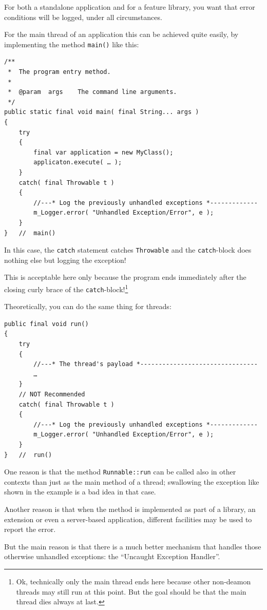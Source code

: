 \documentclass[11pt,a4paper, titlepage, parskip=half, headsepline, footsepline, cleardoublepage=current, headheight=1cm]{scrbook}
\begin{document}
For both a standalone application and for a feature library, you want that error conditions will be logged, under all circumstances.

For the main thread of an application this can be achieved quite easily, by implementing the method \lstinline|main()| like this:
\begin{lstlisting}
/**
 *  The program entry method.
 *
 *  @param  args    The command line arguments.
 */
public static final void main( final String... args )
{
    try
    {
        final var application = new MyClass();
        applicaton.execute( … );
    }
    catch( final Throwable t )
    {
        //---* Log the previously unhandled exceptions *-------------
        m_Logger.error( "Unhandled Exception/Error", e );
    }
}   //  main()
\end{lstlisting}
In this case, the \lstinline|catch| statement catches \lstinline|Throwable| and the 
\lstinline|catch|-block does nothing else but logging the exception!

This is acceptable here only because the program ends immediately after the closing curly brace of the \lstinline|catch|-block!\footnote{Ok, technically only the main thread ends here because other non-deamon threads may still run at this point. But the goal should be that the main thread dies always at last.}

Theoretically, you can do the same thing for threads:
\begin{lstlisting}
public final void run()
{
    try
    {
        //---* The thread's payload *--------------------------------
        …
    }
    // NOT Recommended
    catch( final Throwable t )
    {
        //---* Log the previously unhandled exceptions *-------------
        m_Logger.error( "Unhandled Exception/Error", e );
    }
}   //  run()
\end{lstlisting}

One reason is that the method \lstinline|Runnable::run|\autocite{ORACLE_DOC_RUNNABLE:run} can be called also in other contexts than just as the main method of a thread; swallowing the exception like shown in the example is a bad idea in that case.

Another reason is that when the method is implemented as part of a library, an extension or even a server-based application, different facilities may be used to report the error.

But the main reason is that there is a much better mechanism that handles those otherwise unhandled exceptions: the “Uncaught Exception Handler”\autocite{ORACLE_DOC_UNCAUGHTEXCEPTIONHANDLER_INTERFACE}.
\end{document}
